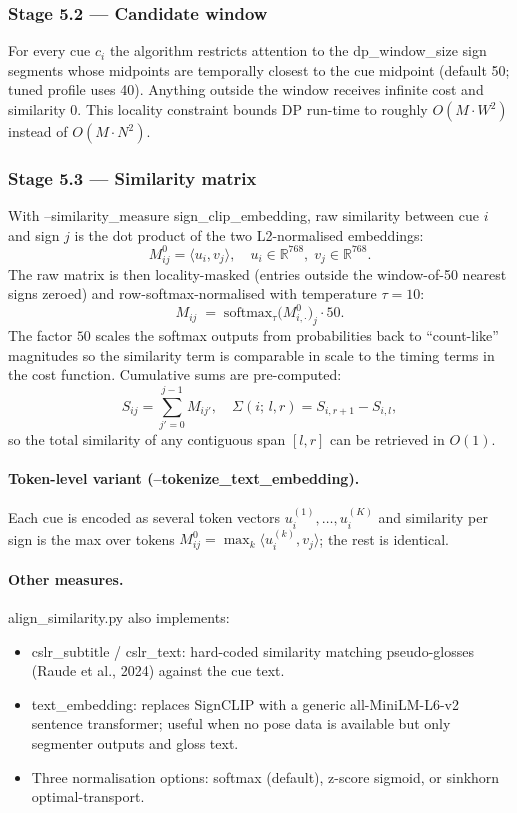 \documentclass[11pt,a4paper]{article}
\def\texttt#1{#1}%
\begin{document}
\subsubsection{Stage 5.2 --- Candidate window}
For every cue $c_i$ the algorithm restricts attention to the
\texttt{dp\_window\_size} sign segments whose midpoints are temporally
closest to the cue midpoint (default 50; tuned profile uses 40). Anything
outside the window receives infinite cost and similarity 0. This locality
constraint bounds DP run-time to roughly $O(M \cdot W^2)$ instead of
$O(M \cdot N^2)$.

\subsubsection{Stage 5.3 --- Similarity matrix}
\label{sec:simmatrix}
With \texttt{--similarity\_measure sign\_clip\_embedding}, raw similarity
between cue $i$ and sign $j$ is the dot product of the two L2-normalised
embeddings:
\[
M^{0}_{ij} = \langle u_i, v_j\rangle, \quad u_i \in \mathbb{R}^{768},\;
v_j \in \mathbb{R}^{768}.
\]
The raw matrix is then locality-masked (entries outside the window-of-50
nearest signs zeroed) and row-softmax-normalised with temperature $\tau=10$:
\[
M_{ij} \;=\; \mathrm{softmax}_{\tau}\bigl(M^{0}_{i,\cdot}\bigr)_{j}\cdot 50.
\]
The factor $50$ scales the softmax outputs from probabilities back to
``count-like'' magnitudes so the similarity term is comparable in scale to
the timing terms in the cost function. Cumulative sums are pre-computed:
\[
S_{ij} = \sum_{j'=0}^{j-1} M_{ij'}, \quad
\Sigma(i;\,l,r) = S_{i,r+1} - S_{i,l},
\]
so the total similarity of any contiguous span $[l, r]$ can be retrieved in
$O(1)$.

\paragraph{Token-level variant (\texttt{--tokenize\_text\_embedding}).} Each
cue is encoded as several token vectors $u_i^{(1)}, \ldots, u_i^{(K)}$ and
similarity per sign is the max over tokens
$M^0_{ij} = \max_k \langle u_i^{(k)}, v_j\rangle$; the rest is identical.

\paragraph{Other measures.} \texttt{align\_similarity.py} also implements:
\begin{itemize}[leftmargin=1.5em]
  \item \texttt{cslr\_subtitle} / \texttt{cslr\_text}: hard-coded similarity
        matching pseudo-glosses (Raude et al., 2024) against the cue text.
  \item \texttt{text\_embedding}: replaces SignCLIP with a generic
        \texttt{all-MiniLM-L6-v2} sentence transformer; useful when no
        pose data is available but only segmenter outputs and gloss text.
  \item Three normalisation options: \texttt{softmax} (default),
        \texttt{z-score} sigmoid, or \texttt{sinkhorn} optimal-transport.
\end{itemize}
\end{document}
